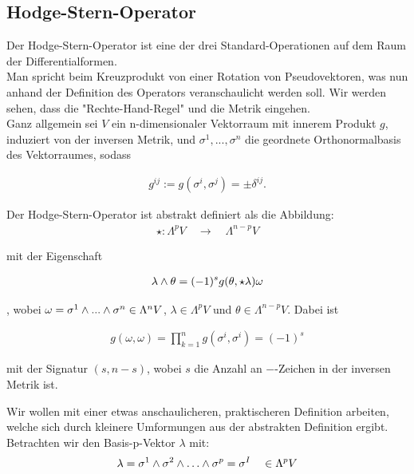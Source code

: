 \subsection{Hodge-Stern-Operator}
Der Hodge-Stern-Operator ist eine der drei Standard-Operationen auf dem Raum der Differentialformen. \\
Man spricht beim Kreuzprodukt von einer Rotation von Pseudovektoren, was nun anhand der Definition des Operators veranschaulicht werden soll. Wir werden sehen, dass die "Rechte-Hand-Regel" und die Metrik eingehen. \\
Ganz allgemein sei $V$ ein n-dimensionaler Vektorraum mit innerem Produkt $g$, induziert von der inversen Metrik, und ${\sigma^1, ..., \sigma^n}$ die geordnete Orthonormalbasis des Vektorraumes, sodass

\begin{align*}
g^{i j} := g(\sigma^{i},\sigma^{j}) = \pm \delta^{i j}.
\end{align*}


Der Hodge-Stern-Operator ist abstrakt definiert als die Abbildung:
\begin{align*}
\star : \Lambda^p V \quad \rightarrow \quad  \Lambda^{n-p} V 
\end{align*}

mit der Eigenschaft

\begin{align}
\lambda \wedge \theta = (-1)^s g(\theta,\star\lambda) \omega
\end{align}

, wobei $\omega = \sigma^1 \wedge ... \wedge \sigma^n \in \Lambda^n V$, $\lambda \in \Lambda^p V$ und $\theta \in \Lambda^{n-p} V$. Dabei ist

 \begin{align}
 g(\omega,\omega) = \prod_{k=1}^{n} g(\sigma^{i},\sigma^{i}) = (-1)^s
 \end{align}
 
mit der Signatur $(s,n-s)$, wobei $s$ die Anzahl an $-$-Zeichen in der inversen Metrik ist.

 
Wir wollen mit einer etwas anschaulicheren, praktischeren Definition arbeiten, welche sich durch kleinere Umformungen aus der abstrakten Definition ergibt. \\

 Betrachten wir den Basis-p-Vektor $\lambda$ mit:
 \begin{align}
 \lambda = \sigma^1 \w \sigma^2 \w \dots \w \sigma^p = \sigma^{I} \quad \in \Lambda^p V
 \end{align}
 
